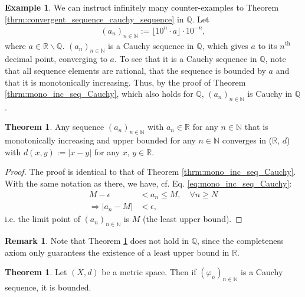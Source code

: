 \documentclass[12pt, a4paper]{article}
\numberwithin{equation}{section}
\theoremstyle{definition}
\theoremstyle{definition}
\newtheorem{exmp}[thm]{Example} %
\newtheorem{remark}[thm]{Remark} %
\newtheorem{theorem}[thm]{Theorem}
\newcommand{\abs}[1]{\left\vert #1 \right\vert}
\newcommand{\floor}[1]{\lfloor #1 \rfloor}
\newcommand{\seq}[1][\varphi]{\left( #1 \right)_{n \in \mathbb{N}}}
\begin{document}
	\begin{exmp}
		We can instruct infinitely many counter-examples to Theorem \ref{thrm:convergent_sequence_cauchy_sequence} in $\mathbb Q$. Let 
		\begin{align}
			\left(a_n\right)_{n\in\mathbb N} := \floor{10^{n} \cdot a}\cdot 10^{-n}, 
		\end{align}
		where $a\in \mathbb R\backslash \mathbb Q$. $(a_n)_{n\in\mathbb N}$ is a Cauchy sequence in $\mathbb Q$, which gives $a$ to its $n^{\text{th}}$ decimal point, converging to $a$. To see that it is a Cauchy sequence in $\mathbb Q$, note that all sequence elements are rational, that the sequence is bounded by $a$ and that it is monotonically increasing. Thus, by the proof of Theorem \ref{thrm:mono_inc_seq_Cauchy}, which also holds for $\mathbb Q$, $\left(a_n\right)_{n\in\mathbb N}$ is Cauchy in $\mathbb Q$.
	\end{exmp}

	\begin{theorem}\label{thrm:mono_inc_seq_converges}
		Any sequence $(a_n)_{n\in\mathbb N}$ with $a_n\in \mathbb R$ for any $n\in \mathbb N$ that is monotonically increasing and upper bounded for any $n\in\mathbb N$ converges in ($\mathbb R$, $d$) with $d(x, y):= \abs{x - y}$ for any $x$, $y\in \mathbb R$.
	\end{theorem}

	\begin{proof}
		The proof is identical to that of Theorem \ref{thrm:mono_inc_seq_Cauchy}. With the same notation as there, we have, cf. Eq. \eqref{eq:mono_inc_seq_Cauchy}:
		\begin{align}
			M - \epsilon &< a_n \leq M, \quad \forall n\geq N
			\\ \Rightarrow \abs{a_n - M} &< \epsilon,
		\end{align}
		i.e. the limit point of $(a_n)_{n\in\mathbb N}$ is $M$ (the least upper bound).
	\end{proof}

	\begin{remark}
		Note that Theorem \ref{thrm:mono_inc_seq_converges} does not hold in $\mathbb Q$, since the completeness axiom only guarantess the existence of a least upper bound in $\mathbb R$.
	\end{remark}

	\begin{theorem}\label{thrm:cauchy_sequences_bounded}
		Let $(X, d)$ be a metric space. Then if $\seq[\varphi_n]$ is a Cauchy sequence, it is bounded.
	\end{theorem}
\end{document}
